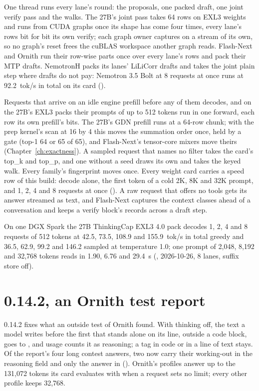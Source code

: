 One thread runs every lane's round: the proposals, one packed draft, one joint verify pass and the walks. The 27B's joint pass takes 64 rows on EXL3 weights and runs from CUDA graphs once its shape has come four times, every lane's rows bit for bit its own verify; each graph owner captures on a stream of its own, so no graph's reset frees the cuBLAS workspace another graph reads. Flash-Next and Ornith run their row-wise parts once over every lane's rows and pack their MTP drafts. NemotronH packs its lanes' LiLiCorr drafts and takes the joint plain step where drafts do not pay: Nemotron 3.5 Bolt at 8 requests at once runs at 92.2~tok/s in total on its card (\measured).

Requests that arrive on an idle engine prefill before any of them decodes, and on the 27B's EXL3 packs their prompts of up to 512 tokens run in one forward, each row its own prefill's bits. The 27B's GDN prefill runs at a 64-row chunk; with the prep kernel's scan at 16 by 4 this moves the summation order once, held by a gate (top-1 64 or 65 of 65), and Flash-Next's tensor-core mixers move theirs (Chapter~\ref{ch:exactness}). A sampled request that names no filter takes the card's top\_k and top\_p, and one without a seed draws its own and takes the keyed walk. Every family's fingerprint moves once. Every weight card carries a speed row of this build: decode alone, the first token of a cold 2K, 8K and 32K prompt, and 1, 2, 4 and 8 requests at once (\measured). A raw request that offers no tools gets its answer streamed as text, and Flash-Next captures the context classes ahead of a conversation and keeps a verify block's records across a draft step.

On one DGX Spark the 27B ThinkingCap EXL3 4.0 pack decodes 1, 2, 4 and 8 requests of 512 tokens at 42.5, 73.5, 108.9 and 155.9~tok/s in total greedy and 36.5, 62.9, 99.2 and 146.2 sampled at temperature 1.0; one prompt of 2,048, 8,192 and 32,768 tokens reads in 1.90, 6.76 and 29.4~s (\measured, 2026-10-26, 8 lanes, suffix store off).

\section{0.14.2, an Ornith test report}\label{sec:changelog-0142}

0.14.2 fixes what an outside test of Ornith found. With thinking off, the text a model writes before the first  that stands alone on its line, outside a code block, goes to , and usage counts it as reasoning; a tag in code or in a line of text stays. Of the report's four long contest answers, two now carry their working-out in the reasoning field and only the answer in  (\measured). Ornith's profiles answer up to the 131,072 tokens its card evaluates with when a request sets no limit; every other profile keeps 32,768.

